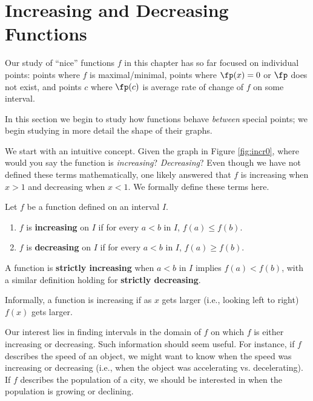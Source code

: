 \section{Increasing and Decreasing Functions}\label{sec:incr_decr}

Our study of ``nice'' functions $f$ in this chapter has so far focused on individual points: points where $f$ is maximal/minimal, points where $\fp(x) = 0$ or $\fp$ does not exist, and points $c$ where $\fp(c)$ is average rate of change of $f$ on some interval. 

In this section we begin to study how functions behave \textit{between} special points; we begin studying in more detail the shape of their graphs. 

We start with an intuitive concept. Given the graph in Figure \ref{fig:incr0}, %
where would you say the function is \textit{increasing}? \textit{Decreasing}? Even though we have not defined these terms mathematically, one likely answered that $f$ is increasing when $x>1$ and decreasing when $x<1$. We formally define these terms here.


{Let $f$ be a function defined on an interval $I$.
\begin{enumerate}
\item		$f$ is \textbf{increasing} on $I$ if for every $a<b$ in $I$, $f(a) \leq f(b)$.
\item		$f$ is \textbf{decreasing} on $I$ if for every $a<b$ in $I$, $f(a) \geq f(b)$.
\end{enumerate}
A function is \textbf{strictly increasing} when $a<b$ in $I$ implies $f(a) < f(b)$, with a similar definition holding for \textbf{strictly decreasing}.
}

Informally, a function is increasing if as $x$ gets larger (i.e., looking left to right) $f(x)$ gets larger.

Our interest lies in finding intervals in the domain of $f$ on which $f$ is either increasing or decreasing. Such information should seem useful. For instance, if $f$ describes the speed of an object, we might want to know when the speed was increasing or decreasing (i.e., when the object was accelerating vs. decelerating). If $f$ describes the population of a city, we should be interested in when the population is growing or declining.

